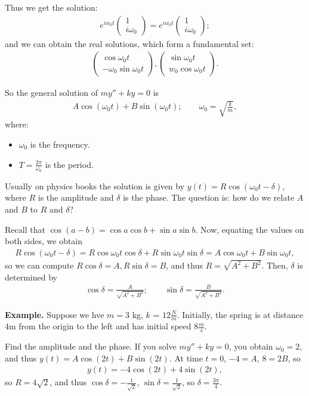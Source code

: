 \documentclass{article}
\newcommand{\mat}[1]{\begin{pmatrix}#1\end{pmatrix}}
\begin{document}
Thus we get the solution:
\begin{align*}
  e^{i w_0 t} \mat{1 \\ i \omega_0} = e^{i w_0 t} \mat{1 \\ i \omega_0};
\end{align*}
and we can obtain the real solutions, which form a fundamental set:
\begin{align*}
  \mat{\cos \omega_0 t \\ - \omega_0 \sin \omega_0 t}, \mat{\sin \omega_0 t \\ w_0 \cos \omega_0 t}.
\end{align*}

So the general solution of $m y'' + ky = 0$ is
\begin{align*}
  A \cos  (\omega_0 t) + B \sin (\omega_0 t); \qquad \omega_0 = \sqrt{\frac{k}{m}},
\end{align*}
where:
\begin{itemize}
  \item $\omega_0$ is the frequency.
  \item $T = \frac{2 \pi}{\omega_0}$ is the period.
\end{itemize}

Usually on physics books the solution is given by $y(t) = R \cos (\omega_0 t - \delta)$, where $R$ is the amplitude and $\delta$ is the phase.  The question is: how do we relate $A$ and $B$ to $R$ and $\delta$?

Recall that $\cos (a - b) = \cos a \cos b + \sin a \sin b$.  Now, equating the values on both sides, we obtain
\begin{align*}
  R \cos (\omega_0 t - \delta) = R \cos \omega_0 t \cos \delta + R \sin \omega_0 t \sin \delta = A \cos \omega_0 t + B \sin \omega_0 t,
\end{align*}
so we can compute $R \cos \delta = A, R \sin \delta = B$, and thus $R = \sqrt{A^2 + B^2}$.  Then, $\delta$ is determined by
\begin{align*}
  \cos \delta = \frac{A}{ \sqrt{A^2 + B^2}}; \qquad \sin \delta = \frac{B}{\sqrt{A^2 + B^2}}.
\end{align*}

{\bf Example.} Suppose we hve $m = 3$ kg, $k$ = $12 \frac{N}{m}$.  Initially, the spring is at distance 4m from the origin to the left and has initial speed $8 \frac{m}{s}$.

Find the amplitude and the phase.  If you solve $my'' + ky = 0$, you obtain $\omega_0 = 2$, and thus $y(t) = A \cos (2 t) + B \sin (2t)$.  At time $t = 0$, $-4 = A$, $8 = 2B$, so
\begin{align*}
  y(t) = -4 \cos (2t) + 4 \sin (2t),
\end{align*}
so  $R = 4 \sqrt{2}$, and thus $\cos \delta = - \frac{1}{\sqrt{2}}$, $\sin \delta = \frac{1}{\sqrt{2}}$, so $\delta = \frac{3 \pi }{4}$. 
\end{document}
